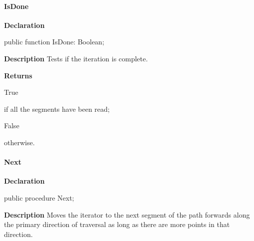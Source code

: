 \documentclass{report}
\newif\ifpdf
\begin{document}
\paragraph*{IsDone}\hspace*{\fill}

\label{NewPascal.GUI.Geom.PathIterator-IsDone}
\begin{list}{}{
\setlength{\itemindent}{0cm}
\setlength{\listparindent}{0cm}
\setlength{\leftmargin}{\evensidemargin}
\addtolength{\leftmargin}{\tmplength}
\settowidth{\labelsep}{X}
\addtolength{\leftmargin}{\labelsep}
\setlength{\labelwidth}{\tmplength}
}
\item[\textbf{Declaration}\hfill]
\ifpdf
\begin{flushleft}
\fi
\begin{ttfamily}
public function IsDone: Boolean;\end{ttfamily}

\ifpdf
\end{flushleft}
\fi

\par
\item[\textbf{Description}]
Tests if the iteration is complete. \par
\item[\textbf{Returns}]\begin{ttfamily}True\end{ttfamily} if all the segments have been read; \begin{ttfamily}False\end{ttfamily} otherwise.


\end{list}
\paragraph*{Next}\hspace*{\fill}

\label{NewPascal.GUI.Geom.PathIterator-Next}
\begin{list}{}{
\setlength{\itemindent}{0cm}
\setlength{\listparindent}{0cm}
\setlength{\leftmargin}{\evensidemargin}
\addtolength{\leftmargin}{\tmplength}
\settowidth{\labelsep}{X}
\addtolength{\leftmargin}{\labelsep}
\setlength{\labelwidth}{\tmplength}
}
\item[\textbf{Declaration}\hfill]
\ifpdf
\begin{flushleft}
\fi
\begin{ttfamily}
public procedure Next;\end{ttfamily}

\ifpdf
\end{flushleft}
\fi

\par
\item[\textbf{Description}]
Moves the iterator to the next segment of the path forwards along the primary direction of traversal as long as there are more points in that direction.

\end{list}
\end{document}
